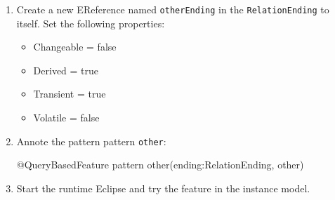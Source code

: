 \documentclass[]{report}
\newenvironment{Shaded}{}{}
\newcommand{\FunctionTok}[1]{\textcolor[rgb]{0.02,0.16,0.49}{{#1}}}
\newcommand{\NormalTok}[1]{{#1}}
\begin{document}
\begin{enumerate}
\def\labelenumi{\arabic{enumi}.}
\item
  Create a new EReference named \texttt{otherEnding} in the
  \texttt{RelationEnding} to itself. Set the following properties:

  \begin{itemize}
  \itemsep1pt\parskip0pt
  \item
    Changeable = false
  \item
    Derived = true
  \item
    Transient = true
  \item
    Volatile = false
  \end{itemize}
\item
  Annote the pattern pattern \texttt{other}:

\begin{Shaded}
\begin{Highlighting}[]
\FunctionTok{@QueryBasedFeature}
\NormalTok{pattern }\FunctionTok{other}\NormalTok{(ending:RelationEnding, other)}
\end{Highlighting}
\end{Shaded}
\item
  Start the runtime Eclipse and try the feature in the instance model.
\end{enumerate}
\end{document}
